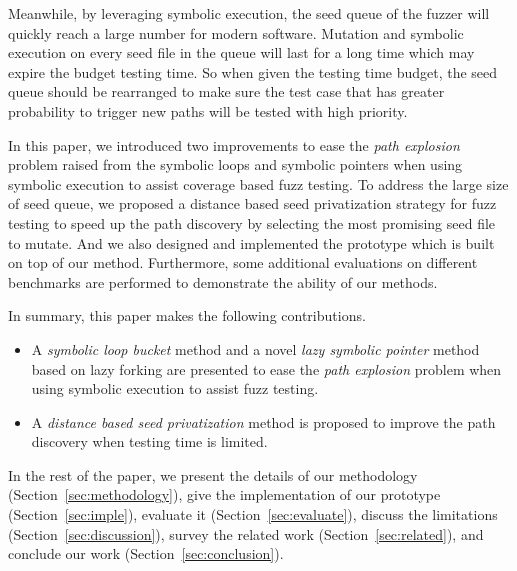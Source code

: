 Meanwhile, by leveraging symbolic execution, the seed queue of the fuzzer will quickly reach a large number for modern software. Mutation and symbolic execution on every seed file in the queue will last for a long time which may expire the budget testing time. So when given the testing time budget, the seed queue should be rearranged to make sure the test case that has greater probability to trigger new paths will be tested with high priority. 

In this paper, we introduced two improvements to ease the \textit{path explosion} problem raised from the symbolic loops and symbolic pointers when using symbolic execution to assist coverage based fuzz testing. To address the large size of seed queue, we proposed a distance based seed privatization strategy for fuzz testing to speed up the path discovery by selecting the most promising seed file to mutate. 
And we also designed and implemented the prototype which is built on top of our method. Furthermore, some additional evaluations on different benchmarks are performed to demonstrate the ability of our methods.

In summary, this paper makes the following contributions.
\begin{itemize}
\item A \emph{symbolic loop bucket} method and a novel \emph{lazy symbolic pointer} method based on lazy forking are presented to ease the \emph{path explosion} problem when using symbolic execution to assist fuzz testing.

\item A \emph{distance based seed privatization} method is proposed to improve the path discovery when testing time is limited.
\end{itemize}

In the rest of the paper, we present the details of our methodology (Section~\ref{sec:methodology}), give the implementation of our prototype (Section~\ref{sec:imple}), evaluate it (Section~\ref{sec:evaluate}), discuss the limitations (Section~\ref{sec:discussion}), survey the related work (Section~\ref{sec:related}), and conclude our work (Section~\ref{sec:conclusion}).
